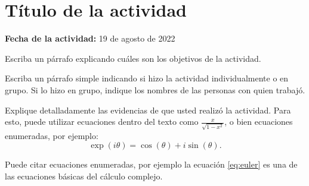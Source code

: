 \documentclass[../portafolio.tex]{subfiles}
\begin{document}


\chapter{Título de la actividad}   %

\hfill \textbf{Fecha de la actividad:} 19 de agosto de 2022

\medskip

Escriba un párrafo explicando cuáles son los objetivos de la actividad.

Escriba un párrafo simple indicando si hizo la actividad
individualmente o en grupo. Si lo hizo en grupo, indique los nombres
de las personas con quien trabajó.



Explique detalladamente las evidencias de que usted realizó la actividad. Para esto, puede utilizar ecuaciones dentro
del texto como $\frac{x}{\sqrt{1-x^2}}$, o bien ecuaciones enumeradas,
por ejemplo:
\begin{equation}\label{eq:euler}
\exp(i\theta) = \cos(\theta) + i\sin(\theta).
\end{equation}

Puede citar ecuaciones enumeradas, por ejemplo la ecuación
\eqref{eq:euler} es una de las ecuaciones básicas del cálculo
complejo.
\end{document}
